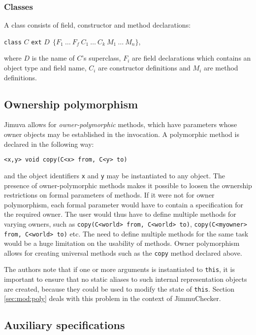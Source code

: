\documentclass{pracamgr}
\theoremstyle{break}
\theoremstyle{break}
\theoremstyle{break}
\begin{document}
\subsubsection{Classes}

A class consists of field, constructor and method declarations:
\begin{center}
\texttt{class}  $C$  \texttt{ext} $D\ \ \lbrace  F_1\ \dots\ F_f\ C_1\ \dots\ C_k\ M_1\ \dots\ M_n\rbrace$, \end{center}
where $D$ is the name of $C$'s superclass, $F_i$ are field
declarations which contains an object type and field name, $C_i$ are
constructor definitions and $M_i$ are method definitions.

\subsection{Ownership polymorphism}
\label{sec:jimuva:poly}

Jimuva allows for \emph{owner-polymorphic} methods, which have
parameters whose owner objects may be established in the invocation. A
polymorphic method is declared in the following way:
\begin{center}
  \texttt{<x,y> void copy(C<x> from, C<y> to)}
\end{center}
and the object identifiers \texttt{x} and \texttt{y} may be
instantiated to any object. The presence of owner-polymorphic methods
makes it possible to loosen the ownership restrictions on formal
parameters of methods. If it were not for owner polymorphism, each
formal parameter would have to contain a specification for the
required owner. The user would thus have to define multiple methods
for varying owners, such as \texttt{copy(C<world> from, C<world> to)},
\texttt{copy(C<myowner> from, C<world> to)} etc. The need to define
multiple methods for the same task would be a huge limitation on the
usability of methods. Owner polymorphism allows for creating universal
methods such as the \texttt{copy} method declared above.

The authors note that if one or more arguments is instantiated to
\texttt{this}, it is important to ensure that no static aliases to
such internal representation objects are created, because they could
be used to modify the state of \texttt{this}. Section
\ref{sec:mod:poly} deals with this problem in the context of
JimmuChecker.


\subsection{Auxiliary specifications}
\label{sub:jimuva-aux}
\end{document}
